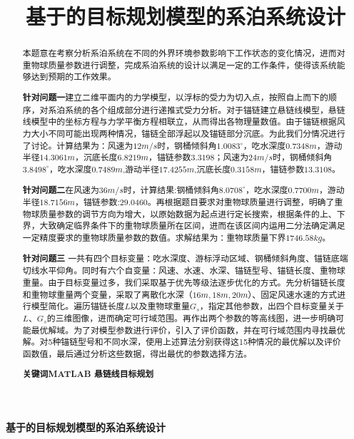 \documentclass{cumcm}
\title{基于的目标规划模型的系泊系统设计}
\begin{document}
 

\begin{minipage}{0.9\textwidth}
\centering\LARGE\textbf{基于的目标规划模型的系泊系统设计}
\end{minipage}

\begin{abstract}
本题意在考察分析系泊系统在不同的外界环境参数影响下工作状态的变化情况，进而对重物球质量参数进行调整，完成系泊系统的设计以满足一定的工作条件，使得该系统能够达到预期的工作效果。\par
\textbf{针对问题一}\quad 建立二维平面内的力学模型，以浮标的受力为切入点，按照自上而下的顺序，对系泊系统的各个组成部分进行递推式受力分析。对于锚链建立悬链线模型，悬链线模型中的坐标方程与力学平衡方程相联立，从而得出各物理量数值。由于锚链根据风力大小不同可能出现两种情况，锚链全部浮起以及锚链部分沉底。为此我们分情况进行了讨论。计算结果为：风速为$12m/s$时，钢桶倾斜角$1.0083^\circ$，吃水深度$0.7348m$，游动半径$14.3061m$，沉底长度$6.8219m$，锚链参数$3.3198$；风速为$24m/s$时，钢桶倾斜角$3.8498^\circ$，吃水深度$0.7489m$,游动半径$17.4255m$,沉底长度$0.3158m$，锚链参数$13.3108$。\par
\textbf{针对问题二}\quad 在风速为$36m/s$时，计算结果:钢桶倾斜角$8.0708^\circ$，吃水深度$0.7700m$，游动半径$18.7156m$，锚链参数:$29.0460$。再根据题目要求对重物球质量进行调整，明确了重物球质量参数的调节方向为增大，以原始数据为起点进行定长搜索，根据条件的上、下界，大致确定临界条件下的重物球质量所在区间，进而在该区间内运用二分法确定满足一定精度要求的重物球质量参数的数值。求解结果为：重物球质量下界$1746.58kg$。\par
\textbf{针对问题三}\quad
一共有四个目标变量：吃水深度、游标浮动区域、钢桶倾斜角度、锚链底端切线水平仰角。同时有六个自变量：风速、水速、水深、锚链型号、锚链长度、重物球重量。由于目标变量过多，我们采取基于优先等级法逐步优化的方式。先分析锚链长度和重物球重量两个变量，采取了离散化水深（$16m,18m,20m$）、固定风速水速的方式进行模型简化。遍历锚链长度$L$以及重物球重量$G_s$，指定其他参数，出四个目标变量关于$L$、$G_s$的三维图像，进而确定可行域范围。再作出两个参数的等高线图，进一步明确可能最优解域。为了对模型参数进行评价，引入了评价函数，并在可行域范围内寻找最优解。对5种锚链型号和不同水深，使用上述算法分别获得这15种情况的最优解以及评价函数值，最后通过分析这些数据，得出最优的参数选择方法。\\ \par


\textbf{关键词\quad MATLAB \quad 悬链线\quad 目标规划}
\end{abstract}
\end{document}
